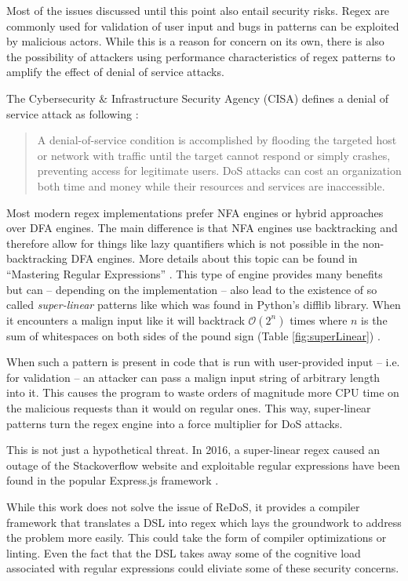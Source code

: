 Most of the issues discussed until this point also entail security risks. Regex are commonly used for validation of user input and bugs in patterns can be exploited by malicious actors. While this is a reason for concern on its own, there is also the possibility of attackers using performance characteristics of regex patterns to amplify the effect of denial of service attacks.

The Cybersecurity \& Infrastructure Security Agency (CISA) defines a denial of service attack as following \cite{DenialOfService}:

{\small
\begin{quote}
A denial-of-service condition is accomplished by flooding the targeted host or network with traffic until the target cannot respond or simply crashes, preventing access for legitimate users. DoS attacks can cost an organization both time and money while their resources and services are inaccessible.
\end{quote}
}

Most modern regex implementations prefer NFA engines or hybrid approaches over DFA engines. The main difference is that NFA engines use backtracking and therefore allow for things like lazy quantifiers which is not possible in the non-backtracking DFA engines. More details about this topic can be found in \enquote{Mastering Regular Expressions} \cite{MasteringRegex}. This type of engine provides many benefits but can -- depending on the implementation -- also lead to the existence of so called \emph{super-linear} patterns like  which was found in Python's difflib library. When it encounters a malign input like  it will backtrack $\mathcal{O}(2^n)$ times where $n$ is the sum of whitespaces on both sides of the pound sign (Table \ref{fig:superLinear}) \cite{RedosInPractice}.

When such a pattern is present in code that is run with user-provided input -- i.e. for validation -- an attacker can pass a malign input string of arbitrary length into it. This causes the program to waste orders of magnitude more CPU time on the malicious requests than it would on regular ones. This way, super-linear patterns turn the regex engine into a force multiplier for DoS attacks.

This is not just a hypothetical threat. In 2016, a super-linear regex caused an outage of the Stackoverflow website \cite{RedosStackOverflowOutage} and exploitable regular expressions have been found in the popular Express.js framework \cite{RedosExpressJs}.

While this work does not solve the issue of ReDoS, it provides a compiler framework that translates a DSL into regex which lays the groundwork to address the problem more easily. This could take the form of compiler optimizations or linting. Even the fact that the DSL takes away some of the cognitive load associated with regular expressions could eliviate some of these security concerns.

